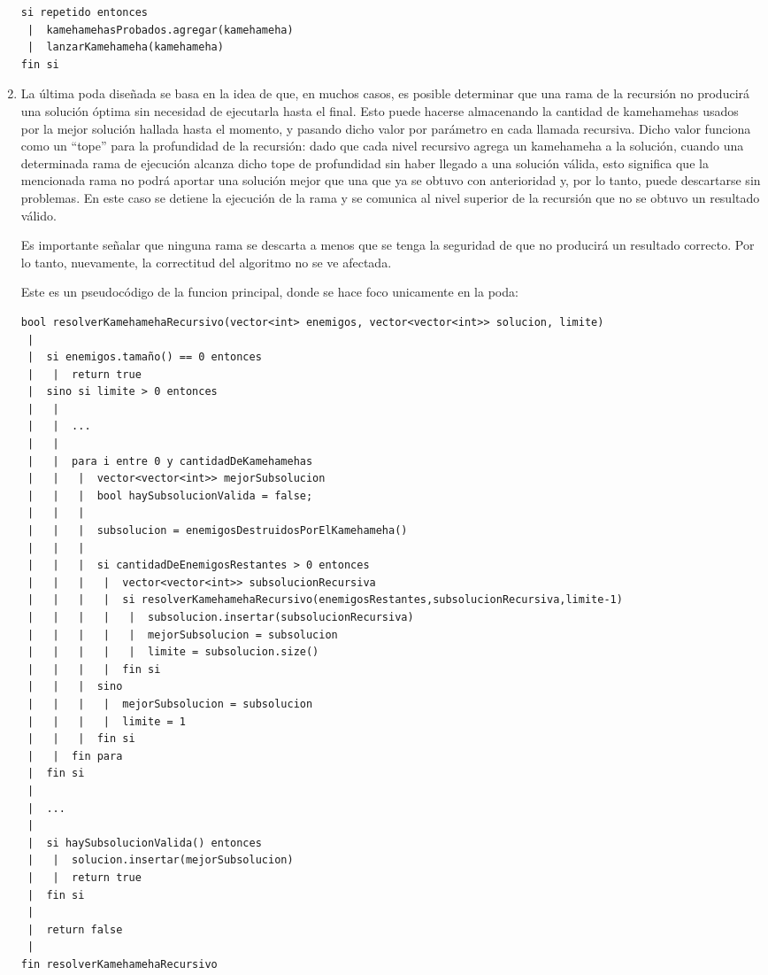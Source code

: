 \begin{enumerate}
\begin{codesnippet}
\begin{verbatim}
si repetido entonces
 |  kamehamehasProbados.agregar(kamehameha)
 |  lanzarKamehameha(kamehameha)
fin si
        \end{verbatim}
        \end{codesnippet}

        \item La última poda diseñada se basa en la idea de que, en muchos casos, es posible determinar que una rama de la recursión no producirá una solución óptima sin necesidad de ejecutarla hasta el final. Esto puede hacerse almacenando la cantidad de kamehamehas usados por la mejor solución hallada hasta el momento, y pasando dicho valor por parámetro en cada llamada recursiva. Dicho valor funciona como un ``tope'' para la profundidad de la recursión: dado que cada nivel recursivo agrega un kamehameha a la solución, cuando una determinada rama de ejecución alcanza dicho tope de profundidad sin haber llegado a una solución válida, esto significa que la mencionada rama no podrá aportar una solución mejor que una que ya se obtuvo con anterioridad y, por lo tanto, puede descartarse sin problemas. En este caso se detiene la ejecución de la rama y se comunica al nivel superior de la recursión que no se obtuvo un resultado válido.

        Es importante señalar que ninguna rama se descarta a menos que se tenga la seguridad de que no producirá un resultado correcto. Por lo tanto, nuevamente, la correctitud del algoritmo no se ve afectada.

        Este es un pseudocódigo de la funcion principal, donde se hace foco unicamente en la poda:

        \begin{codesnippet}
        \begin{verbatim}
bool resolverKamehamehaRecursivo(vector<int> enemigos, vector<vector<int>> solucion, limite)
 |
 |  si enemigos.tamaño() == 0 entonces
 |   |  return true
 |  sino si limite > 0 entonces
 |   |
 |   |  ...
 |   |  
 |   |  para i entre 0 y cantidadDeKamehamehas
 |   |   |  vector<vector<int>> mejorSubsolucion
 |   |   |  bool haySubsolucionValida = false;
 |   |   |
 |   |   |  subsolucion = enemigosDestruidosPorElKamehameha()
 |   |   |
 |   |   |  si cantidadDeEnemigosRestantes > 0 entonces
 |   |   |   |  vector<vector<int>> subsolucionRecursiva
 |   |   |   |  si resolverKamehamehaRecursivo(enemigosRestantes,subsolucionRecursiva,limite-1)
 |   |   |   |   |  subsolucion.insertar(subsolucionRecursiva)
 |   |   |   |   |  mejorSubsolucion = subsolucion
 |   |   |   |   |  limite = subsolucion.size()
 |   |   |   |  fin si
 |   |   |  sino
 |   |   |   |  mejorSubsolucion = subsolucion
 |   |   |   |  limite = 1
 |   |   |  fin si
 |   |  fin para
 |  fin si
 |
 |  ...
 |
 |  si haySubsolucionValida() entonces
 |   |  solucion.insertar(mejorSubsolucion)
 |   |  return true
 |  fin si
 |
 |  return false
 |
fin resolverKamehamehaRecursivo
        \end{verbatim}
        \end{codesnippet}


\end{enumerate}
